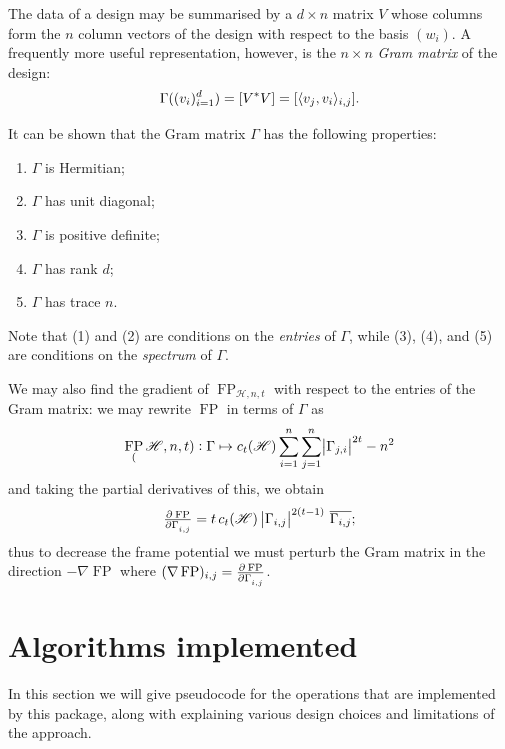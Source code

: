 \documentclass{article}
\newcommand{\scrH}{\mathscr{H}}
\DeclareMathOperator{\FP}{FP}
\DeclarePairedDelimiter{\inp}{\langle}{\rangle}
\newcommand{\df}{\textit}
\theoremstyle{definition}
\begin{document}
  The data of a design may be summarised by a $ d \times n $ matrix $ V $ whose columns form
  the $ n $ column vectors of the design with respect to the basis $ (w_i) $. A frequently
  more useful representation, however, is the $ n \times n $ \df{Gram matrix} of the design:
  \begin{displaymath}
    \Gamma((v_i)_{i=1}^d) = [V^* V] = [\inp{v_j,v_i}_{i,j}].
  \end{displaymath}
  
  It can be shown that the Gram matrix $ \Gamma $ has the following properties:
  \begin{enumerate}[label=(G\arabic*)]\label{pg:gram_properties}
    \item $ \Gamma $ is Hermitian;
    \item $ \Gamma $ has unit diagonal;
    \item $ \Gamma $ is positive definite;
    \item $ \Gamma $ has rank $ d $;
    \item $ \Gamma $ has trace $ n $.
  \end{enumerate}
  Note that (1) and (2) are conditions on the \emph{entries} of $ \Gamma $, while (3), (4), and (5) are conditions
  on the \emph{spectrum} of $ \Gamma $.
  
  We may also find the gradient of $ \FP_{\scrH,n,t} $ with respect to the entries of the Gram
  matrix: we may rewrite $ \FP $ in terms of $ \Gamma $ as
  \begin{displaymath}
    \FP_(\scrH,n,t) : \Gamma \mapsto c_t(\scrH) \sum_{i = 1}^n \sum_{j = 1}^n \abs{\Gamma_{j,i}}^{2t} - n^2
  \end{displaymath}
  and taking the partial derivatives of this, we obtain
  \begin{displaymath}
    \pd{\FP}{\Gamma_{i,j}} = t\thinspace c_t(\scrH)\thinspace \abs{\Gamma_{i,j}}^{2(t-1)} \thinspace \overline{\Gamma_{i,j}};
  \end{displaymath}
  thus to decrease the frame potential we must perturb the Gram matrix in the direction $ -\nabla \FP $
  where $ (\nabla \FP)_{i,j} = \pd{\FP}{\Gamma_{i,j}} $.
  
  \section{Algorithms implemented}
  In this section we will give pseudocode for the operations that are implemented by this
  package, along with explaining various design choices and limitations of the approach.
\end{document}
